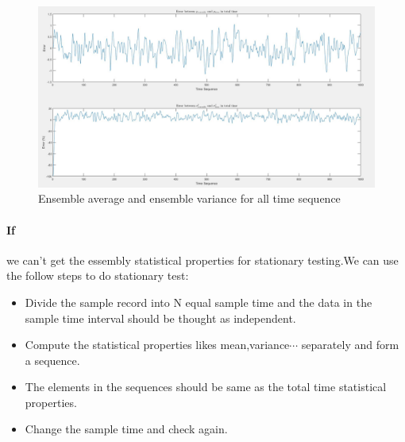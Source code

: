 \documentclass[12pt,a4paper]{article}
\begin{document}
			\begin{figure}[H]
				\centering
				\includegraphics[scale=0.4]{Problem3e}
				\caption[Ensemble average and essemble variance for all time sequence]{Ensemble average and ensemble variance for all time sequence}
			\end{figure}
			\paragraph{If}we can't get the essembly statistical properties for stationary testing.We can use the follow steps to do stationary test:
				\begin{itemize}
					\item Divide the sample record into N equal sample time and the data in the sample time interval should be thought as independent.
					\item Compute the statistical properties likes mean,variance$\cdots$ separately and form a sequence.
					\item The elements in the sequences should be same as the total time statistical properties.
					\item Change the sample time and check again.
				\end{itemize} 
\end{document}
